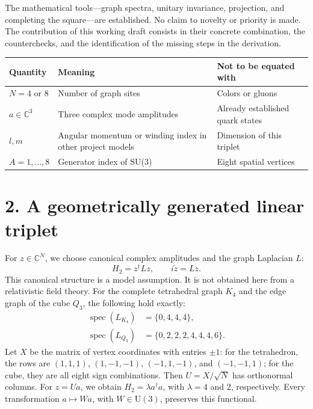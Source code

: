 \documentclass[a4paper,11pt]{article}
\newcommand{\C}{\mathbb C}
\newenvironment{drafttable}{\begin{center}\small\renewcommand{\arraystretch}{1.2}}{\end{center}}
\begin{document}
The mathematical tools---graph spectra, unitary invariance, projection, and completing the square---are established. No claim to novelty or priority is made. The contribution of this working draft consists in their concrete combination, the counterchecks, and the identification of the missing steps in the derivation.

\begin{drafttable}
\begin{tabularx}{\linewidth}{@{}lXX@{}}
\toprule
Quantity & Meaning & Not to be equated with\\\midrule
$N=4$ or $8$ & Number of graph sites & Colors or gluons\\
$a\in\C^3$ & Three complex mode amplitudes & Already established quark states\\
$l,m$ & Angular momentum or winding index in other project models & Dimension of this triplet\\
$A=1,\ldots,8$ & Generator index of SU(3) & Eight spatial vertices\\\bottomrule
\end{tabularx}
\end{drafttable}

\section*{2. A geometrically generated linear triplet}
For $z\in\C^N$, we choose canonical complex amplitudes and the graph Laplacian $L$:
\begin{equation}
H_2=z^\dagger Lz,\qquad i\dot z=Lz. \tag{1}
\end{equation}
This canonical structure is a model assumption. It is not obtained here from a relativistic field theory. For the complete tetrahedral graph $K_4$ and the edge graph of the cube $Q_3$, the following hold exactly:
\begin{equation}
\begin{aligned}
\operatorname{spec}(L_{K_4})&=\{0,4,4,4\},\\
\operatorname{spec}(L_{Q_3})&=\{0,2,2,2,4,4,4,6\}.
\end{aligned}\tag{2}
\end{equation}
Let $X$ be the matrix of vertex coordinates with entries $\pm1$: for the tetrahedron, the rows are $(1,1,1)$, $(1,-1,-1)$, $(-1,1,-1)$, and $(-1,-1,1)$; for the cube, they are all eight sign combinations. Then $U=X/\sqrt N$ has orthonormal columns. For $z=Ua$, we obtain $H_2=\lambda a^\dagger a$, with $\lambda=4$ and $2$, respectively. Every transformation $a\mapsto Wa$, with $W\in\mathrm{U}(3)$, preserves this functional.
\end{document}
